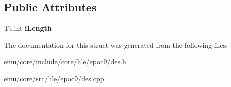 \subsection*{Public Attributes}
\begin{DoxyCompactItemize}
\item 
\mbox{\label{struct_t_des_c8_aa0bf3cdc17cc0c97f205368ff0a97f6b}} 
T\+Uint {\bfseries i\+Length}
\end{DoxyCompactItemize}


The documentation for this struct was generated from the following files\+:\begin{DoxyCompactItemize}
\item 
emu/core/include/core/hle/epoc9/des.\+h\item 
emu/core/src/hle/epoc9/des.\+cpp\end{DoxyCompactItemize}
